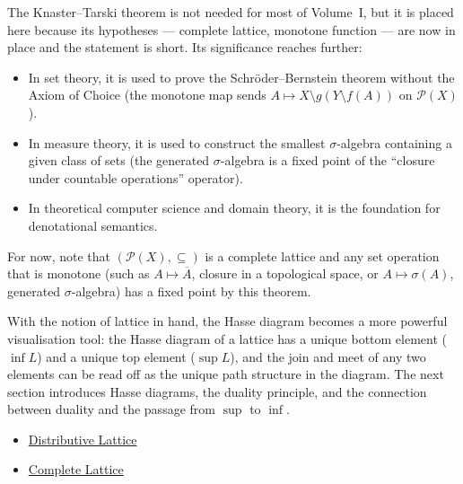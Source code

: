 \begin{remark*}
\label{rem:knaster-tarski-context}
The Knaster--Tarski theorem is not needed for most of Volume~I, but it is
placed here because its hypotheses — complete lattice, monotone function —
are now in place and the statement is short.  Its significance reaches
further:
\begin{itemize}
  \item In set theory, it is used to prove the Schröder--Bernstein theorem
        without the Axiom of Choice (the monotone map sends $A \mapsto
        X \setminus g(Y \setminus f(A))$ on $\mathcal{P}(X)$).
  \item In measure theory, it is used to construct the smallest
        $\sigma$-algebra containing a given class of sets (the
        generated $\sigma$-algebra is a fixed point of the ``closure
        under countable operations'' operator).
  \item In theoretical computer science and domain theory, it is the
        foundation for denotational semantics.
\end{itemize}
For now, note that $(\mathcal{P}(X), \subseteq)$ is a complete lattice and
any set operation that is monotone (such as $A \mapsto \overline{A}$, closure
in a topological space, or $A \mapsto \sigma(A)$, generated $\sigma$-algebra)
has a fixed point by this theorem.
\end{remark*}

\begin{remark*}[Transition]
\label{rem:transition-to-hasse}
With the notion of lattice in hand, the Hasse diagram becomes a more powerful
visualisation tool: the Hasse diagram of a lattice has a unique bottom element
($\inf L$) and a unique top element ($\sup L$), and the join and meet of any
two elements can be read off as the unique path structure in the diagram.
The next section introduces Hasse diagrams, the duality principle, and the
connection between duality and the passage from $\sup$ to $\inf$.
\end{remark*}

\begin{dependencies}
\begin{itemize}
  \item \hyperref[def:distributive-lattice]{Distributive Lattice}
  \item \hyperref[def:complete-lattice]{Complete Lattice}
\end{itemize}
\end{dependencies}
